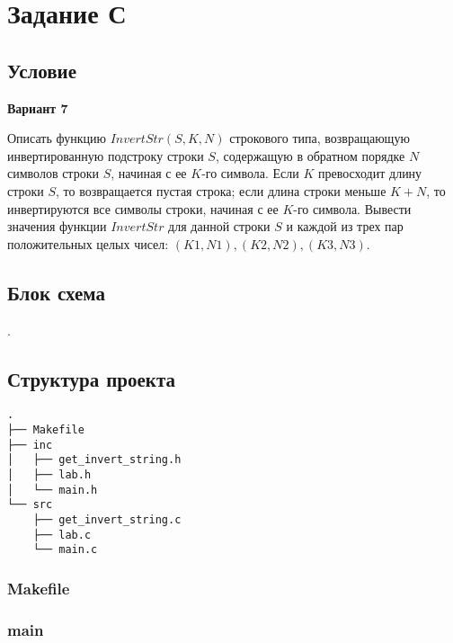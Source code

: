 \documentclass[12pt, a4paper]{article}
\begin{document}
\newpage

\section{Задание С}

\subsection{Условие}

\begin{center}
    \textbf{Вариант 7}
\end{center}

Описать функцию $InvertStr(S, K, N)$ строкового типа, возвращающую инвертированную подстроку строки $S$, содержащую в обратном порядке $N$ символов строки $S$, начиная с ее $K$-го символа. Если $K$ превосходит длину строки $S$, то возвращается пустая строка; если длина строки меньше $K + N$, то инвертируются все символы строки, начиная с ее $K$-го символа. Вывести значения функции $InvertStr$ для данной строки $S$ и каждой из трех пар положительных целых чисел: $(K1, N1), (K2, N2), (K3, N3)$.

\subsection{Блок схема}

.

\subsection{Структура проекта}

\begin{verbatim}
.
├── Makefile
├── inc
│   ├── get_invert_string.h
│   ├── lab.h
│   └── main.h
└── src
    ├── get_invert_string.c
    ├── lab.c
    └── main.c
\end{verbatim}

\subsubsection{Makefile}


\subsubsection{main}


\end{document}
